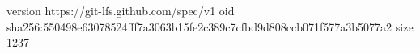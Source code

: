 version https://git-lfs.github.com/spec/v1
oid sha256:550498e63078524fff7a3063b15fe2c389c7cfbd9d808ccb071f577a3b5077a2
size 1237
